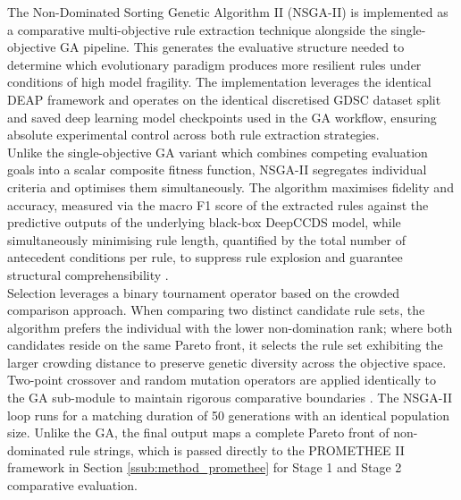 \label{sub:method_nsga}
The Non-Dominated Sorting Genetic Algorithm II (NSGA-II) is implemented as a 
comparative multi-objective rule extraction technique alongside the single-objective 
GA pipeline. This generates the evaluative structure needed to determine which 
evolutionary paradigm produces more resilient rules under conditions of high model 
fragility. The implementation leverages the identical DEAP framework and operates 
on the identical discretised GDSC dataset split and saved deep learning model checkpoints 
used in the GA workflow, ensuring absolute experimental control across both rule 
extraction strategies.
\\
Unlike the single-objective GA variant which combines competing evaluation goals into 
a scalar composite fitness function, NSGA-II segregates individual criteria and 
optimises them simultaneously. The algorithm maximises fidelity and accuracy, 
measured via the macro F1 score of the extracted rules against the predictive outputs 
of the underlying black-box DeepCCDS model, while simultaneously minimising rule 
length, quantified by the total number of antecedent conditions per rule, to suppress 
rule explosion and guarantee structural comprehensibility \cite{Yedjour2024}.
\\
Selection leverages a binary tournament operator based on the crowded comparison 
approach. When comparing two distinct candidate rule sets, the algorithm prefers the 
individual with the lower non-domination rank; where both candidates reside on the 
same Pareto front, it selects the rule set exhibiting the larger crowding distance to 
preserve genetic diversity across the objective space. 
\\
Two-point crossover and random mutation operators are applied identically to the GA 
sub-module to maintain rigorous comparative boundaries \cite{Yedjour2024}. The 
NSGA-II loop runs for a matching duration of 50 generations with an identical population 
size. Unlike the GA, the final output maps a complete Pareto front of non-dominated 
rule strings, which is passed directly to the PROMETHEE II framework in Section 
\ref{ssub:method_promethee} for Stage 1 and Stage 2 comparative evaluation.